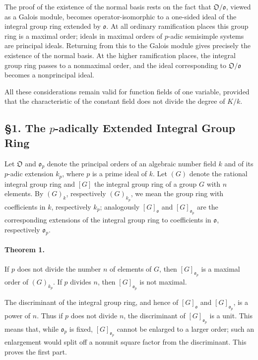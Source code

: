 \documentclass[11pt]{article}
\providecommand{\frako}{\mathfrak o}
\providecommand{\frakO}{\mathfrak O}
\begin{document}
The proof of the existence of the normal basis rests on the fact that \(\frakO/\frako\), viewed as a Galois module, becomes operator-isomorphic to a one-sided ideal of the integral group ring extended by \(\frako\). At all ordinary ramification places this group ring is a maximal order; ideals in maximal orders of \(p\)-adic semisimple systems are principal ideals. Returning from this to the Galois module gives precisely the existence of the normal basis. At the higher ramification places, the integral group ring passes to a nonmaximal order, and the ideal corresponding to \(\frakO/\frako\) becomes a nonprincipal ideal.

All these considerations remain valid for function fields of one variable, provided that the characteristic of the constant field does not divide the degree of \(K/k\).

\subsection*{§1. The \(p\)-adically Extended Integral Group Ring}

Let \(\frakO\) and \(\frako_p\) denote the principal orders of an algebraic number field \(k\) and of its \(p\)-adic extension \(k_p\), where \(p\) is a prime ideal of \(k\). Let \((G)\) denote the rational integral group ring and \([G]\) the integral group ring of a group \(G\) with \(n\) elements. By \((G)_k\), respectively \((G)_{k_p}\), we mean the group ring with coefficients in \(k\), respectively \(k_p\); analogously \([G]_{\frako}\) and \([G]_{\frako_p}\) are the corresponding extensions of the integral group ring to coefficients in \(\frako\), respectively \(\frako_p\).

\paragraph{Theorem 1.}
If \(p\) does not divide the number \(n\) of elements of \(G\), then \([G]_{\frako_p}\) is a maximal order of \((G)_{k_p}\). If \(p\) divides \(n\), then \([G]_{\frako_p}\) is not maximal.

The discriminant of the integral group ring, and hence of \([G]_{\frako}\) and \([G]_{\frako_p}\), is a power of \(n\). Thus if \(p\) does not divide \(n\), the discriminant of \([G]_{\frako_p}\) is a unit. This means that, while \(\frako_p\) is fixed, \([G]_{\frako_p}\) cannot be enlarged to a larger order; such an enlargement would split off a nonunit square factor from the discriminant. This proves the first part.
\end{document}
